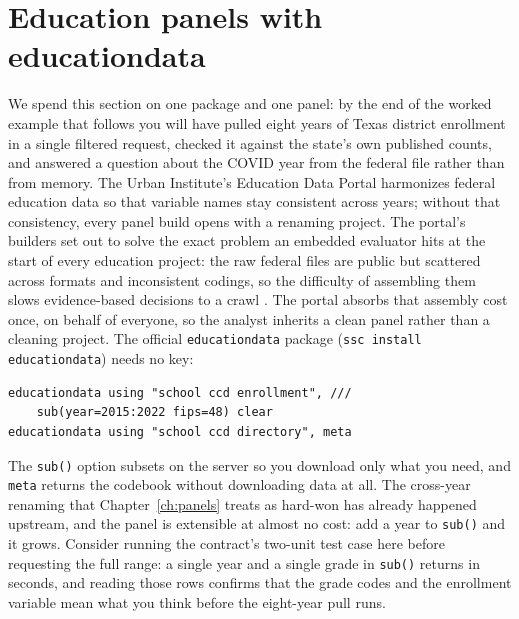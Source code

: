 \documentclass[
    a4paper,
    fontsize=10pt,
    twoside=true,
    numbers=noenddot,
]{kaobook}
\begin{document}
\section{Education panels with educationdata}
We spend this section on one package and one panel: by the end of the worked example that follows you will have pulled eight years of Texas district enrollment in a single filtered request, checked it against the state's own published counts, and answered a question about the COVID year from the federal file rather than from memory. The Urban Institute's Education Data Portal harmonizes federal education data so that variable names stay consistent across years; without that consistency, every panel build opens with a renaming project. The portal's builders set out to solve the exact problem an embedded evaluator hits at the start of every education project: the raw federal files are public but scattered across formats and inconsistent codings, so the difficulty of assembling them slows evidence-based decisions to a crawl \parencite{chingos2018portal}. The portal absorbs that assembly cost once, on behalf of everyone, so the analyst inherits a clean panel rather than a cleaning project. The official \texttt{educationdata} package (\texttt{ssc install educationdata}) needs no key:
\par
{\footnotesize
\begin{verbatim}
educationdata using "school ccd enrollment", ///
    sub(year=2015:2022 fips=48) clear
educationdata using "school ccd directory", meta
\end{verbatim}
}
The \texttt{sub()} option subsets on the server so you download only what you need, and \texttt{meta} returns the codebook without downloading data at all. The cross-year renaming that Chapter~\ref{ch:panels} treats as hard-won has already happened upstream, and the panel is extensible at almost no cost: add a year to \texttt{sub()} and it grows. Consider running the contract's two-unit test case here before requesting the full range: a single year and a single grade in \texttt{sub()} returns in seconds, and reading those rows confirms that the grade codes and the enrollment variable mean what you think before the eight-year pull runs.
\end{document}
